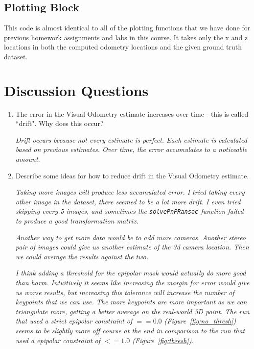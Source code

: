 \documentclass[11pt]{article}
\begin{document}
\subsection{Plotting Block}

This code is almost identical to all of the plotting functions that we have done for previous homework assignments and labs in this course.
It takes only the x and z locations in both the computed odometry locations and the given ground truth dataset.

\section{Discussion Questions}

\begin{enumerate}
	\item The error in the Visual Odometry estimate increases over time - this is called  ``drift".
		Why does this occur?

		{\it Drift occurs because not every estimate is perfect. 
		Each estimate is calculated based on previous estimates.
		Over time, the error accumulates to a noticeable amount.}

	\item Describe some ideas for how to reduce drift in the Visual Odometry estimate.

		{\it Taking more images will produce less accumulated error.
		I tried taking every other image in the dataset, there seemed to be a lot more drift.
		I even tried skipping every 5 images, and sometimes the {\tt solvePnPRansac} function failed to produce a good transformation matrix.}

		{\it Another way to get more data would be to add more cameras.
		Another stereo pair of images could give us another estimate of the 3d camera location.
		Then we could average the results against the two.}

		{\it I think adding a threshold for the epipolar mask would actually do more good than harm.
		Intuitively it seems like increasing the margin for error would give us worse results, but increasing this tolerance will increase the number of keypoints that we can use.
		The more keypoints are more important as we can triangulate more, getting a better average on the real-world 3D point.
		The run that used a strict epipolar constraint of $==0.0$ (Figure~\ref{fig:no_thresh}) seems to be slightly more off course at the end in comparison to the run that used a epipolar constraint of $<=1.0$ (Figure~\ref{fig:thresh}).}

\end{enumerate}
\end{document}
